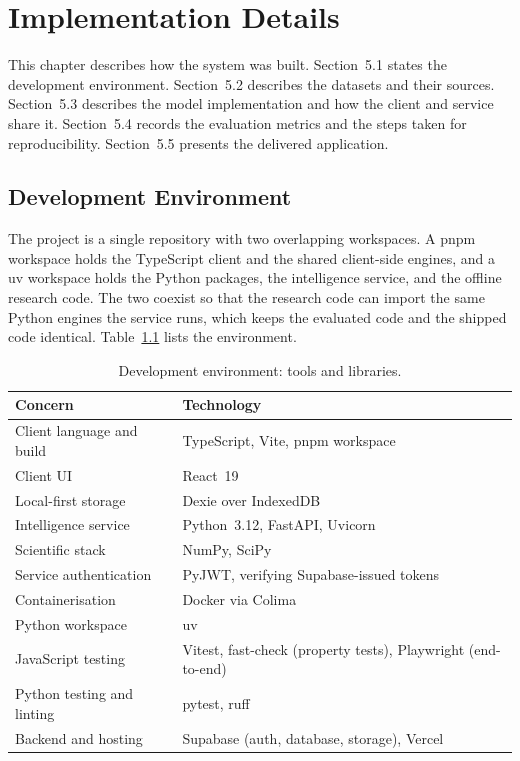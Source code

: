 \chapter{Implementation Details}
This chapter describes how the system was built. Section~5.1 states the development environment. Section~5.2 describes the datasets and their sources. Section~5.3 describes the model implementation and how the client and service share it. Section~5.4 records the evaluation metrics and the steps taken for reproducibility. Section~5.5 presents the delivered application.

\section{Development Environment}
The project is a single repository with two overlapping workspaces. A pnpm workspace holds the TypeScript client and the shared client-side engines, and a uv workspace holds the Python packages, the intelligence service, and the offline research code. The two coexist so that the research code can import the same Python engines the service runs, which keeps the evaluated code and the shipped code identical. Table~\ref{tab:tools} lists the environment.

\begin{table}[htbp]
\centering
\footnotesize
\caption{Development environment: tools and libraries.}
\label{tab:tools}
\begin{tabular}{p{4.0cm} p{8.4cm}}
\toprule
\textbf{Concern} & \textbf{Technology} \\
\midrule
Client language and build & TypeScript, Vite, pnpm workspace \\
Client UI & React~19 \\
Local-first storage & Dexie over IndexedDB \\
Intelligence service & Python~3.12, FastAPI, Uvicorn \\
Scientific stack & NumPy, SciPy \\
Service authentication & PyJWT, verifying Supabase-issued tokens \\
Containerisation & Docker via Colima \\
Python workspace & uv \\
JavaScript testing & Vitest, fast-check (property tests), Playwright (end-to-end) \\
Python testing and linting & pytest, ruff \\
Backend and hosting & Supabase (auth, database, storage), Vercel \\
\bottomrule
\end{tabular}
\end{table}

